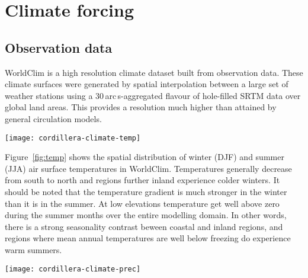 
\section{Climate forcing}
\label{sec:climate}


\subsection{Observation data}

WorldClim \citep{data:worldclim} is a high resolution climate dataset built from observation data. These climate surfaces were generated by spatial interpolation between a large set of weather stations using a 30\,arc\,s-aggregated flavour of hole-filled SRTM data over global land areas. This provides a resolution much higher than attained by general circulation models.

\begin{figure*}[t]
	\vspace*{2mm}
	\begin{center}
		\texttt{[image: cordillera-climate-temp]}
	\end{center}
	\caption{Summer temperature maps from the five datasets used in this study and winter temperature map from the WorldClim dataset.}
	\label{fig:temp}
\end{figure*}

Figure~\ref{fig:temp} shows the spatial distribution of winter (DJF) and summer (JJA) air surface temperatures in WorldClim. Temperatures generally decrease from south to north and regions further inland experience colder winters. It should be noted that the temperature gradient is much stronger in the winter than it is in the summer. At low elevations temperature get well above zero during the summer months over the entire modelling domain. In other words, there is a strong seasonality contrast beween coastal and inland regions, and regions where mean annual temperatures are well below freezing do experience warm summers.

\begin{figure*}[t]
	\vspace*{2mm}
	\begin{center}
		\texttt{[image: cordillera-climate-prec]}
	\end{center}
	\caption{Winter precipitation rate maps from the five datasets used in this study and summer precipitation map from the WorldClim dataset.}
	\label{fig:prec}
\end{figure*}


